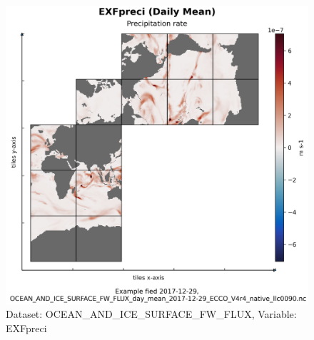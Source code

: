 \begin{figure}[H]
\centering
\includegraphics[scale=0.55]{../images/plots/native_plots/Ocean_and_Sea-Ice_Surface_Freshwater_Fluxes/EXFpreci.png}
\caption{Dataset: OCEAN\_AND\_ICE\_SURFACE\_FW\_FLUX, Variable: EXFpreci}
\label{tab:table-OCEAN_AND_ICE_SURFACE_FW_FLUX_EXFpreci-Plot}
\end{figure}
\pagebreak
